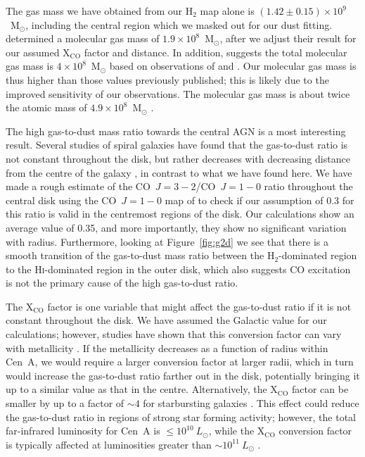 \documentclass[useAMS,usenatbib,usegraphicx]{mn2e}
\begin{document}
The gas mass we have obtained from our H$_{2}$ map alone is $(1.42 \pm 0.15) \times 10^{9}$~M$_{\odot}$, including the central region which we masked out for our dust fitting.  \citet{1990ApJ...363..451E} determined a molecular gas mass of $1.9 \times 10^{8}$~M$_{\odot}$, after we adjust their result for our assumed X$_{\mathrm{CO}}$ factor and distance.  In addition, \citet{2010PASA...27..463M} suggests the total molecular gas mass is $4 \times 10^{8}$~M$_{\odot}$ based on observations of \citet{1990ApJ...363..451E} and \citet{1992ApJ...391..121Q}.  Our molecular gas mass is thus higher than those values previously published; this is likely due to the improved sensitivity of our observations.  The molecular gas mass is about twice the atomic mass of $4.9 \times 10^{8}$~M$_{\odot}$ \citep{2010A&A...515A..67S}.

The high gas-to-dust mass ratio towards the central AGN is a most interesting result.  Several studies of spiral galaxies have found that the gas-to-dust ratio is not constant throughout the disk, but rather decreases with decreasing distance from the centre of the galaxy \citep[e.g.][]{2009ApJ...701.1965M,2010MNRAS.402.1409B,2011arXiv1106.0618M}, in contrast to what we have found here.  We have made a rough estimate of the CO~$J=3-2$/CO~$J=1-0$ ratio throughout the central disk using the CO~$J=1-0$ map of \citet{1990ApJ...363..451E} to check if our assumption of 0.3 for this ratio is valid in the centremost regions of the disk.  Our calculations show an average value of 0.35, and more importantly, they show no significant variation with radius.  Furthermore, looking at Figure~\ref{fig:g2d} we see that there is a smooth transition of the gas-to-dust mass ratio between the H$_{2}$-dominated region to the H\textsc{i}-dominated region in the outer disk, which also suggests CO excitation is not the primary cause of the high gas-to-dust ratio.

The X$_{\mathrm{CO}}$ factor is one variable that might affect the gas-to-dust ratio if it is not constant throughout the disk.  We have assumed the Galactic value for our calculations; however, studies have shown that this conversion factor can vary with metallicity \citep{1995ApJ...448L..97W, 1997A&A...328..471I, 2000mhs..conf..293I, 2000MNRAS.317..649B, 2003A&A...397...87I, 2004A&A...422L..47S, 2005A&A...438..855I, 2011ApJ...737...12L}.  If the metallicity decreases as a function of radius within Cen~A, we would require a larger conversion factor at larger radii, which in turn would increase the gas-to-dust ratio farther out in the disk, potentially bringing it up to a similar value as that in the centre.  Alternatively, the X$_{\mathrm{CO}}$ factor can be smaller by up to a factor of $\sim 4$ for starbursting galaxies \citep{1998ApJ...507..615D}.  This effect could reduce the gas-to-dust ratio in regions of strong star forming activity; however, the total far-infrared luminosity for Cen~A is $\le 10^{10}~L_{\odot}$, while the X$_{\mathrm{CO}}$ conversion factor is typically affected at luminosities greater than $\sim 10^{11}~L_{\odot}$ \citep[e.g.][]{1993ApJ...414L..13D, 1997ApJ...478..144S}.
\end{document}
